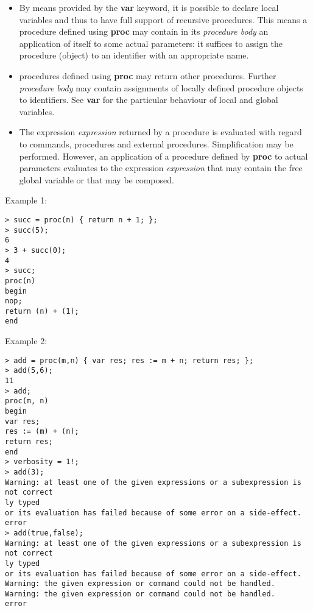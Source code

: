 \begin{itemize}
\item By means provided by the \textbf{var} keyword, it is possible to declare local
   variables and thus to have full support of recursive procedures. This
   means a procedure defined using \textbf{proc} may contain in its \emph{procedure body} 
   an application of itself to some actual parameters: it suffices
   to assign the procedure (object) to an identifier with an appropriate
   name.

\item \sollya procedures defined using \textbf{proc} may return other
   procedures. Further \emph{procedure body} may contain assignments of
   locally defined procedure objects to identifiers. See \textbf{var} for the
   particular behaviour of local and global variables.

\item The expression \emph{expression} returned by a procedure is evaluated with
   regard to \sollya commands, procedures and external
   procedures. Simplification may be performed.  However, an application
   of a procedure defined by \textbf{proc} to actual parameters evaluates to the
   expression \emph{expression} that may contain the free global variable or
   that may be composed.
\end{itemize}
\noindent Example 1: 
\begin{center}\begin{minipage}{15cm}\begin{Verbatim}[frame=single]
> succ = proc(n) { return n + 1; };
> succ(5);
6
> 3 + succ(0);
4
> succ;
proc(n)
begin
nop;
return (n) + (1);
end
\end{Verbatim}
\end{minipage}\end{center}
\noindent Example 2: 
\begin{center}\begin{minipage}{15cm}\begin{Verbatim}[frame=single]
> add = proc(m,n) { var res; res := m + n; return res; };
> add(5,6);
11
> add;
proc(m, n)
begin
var res;
res := (m) + (n);
return res;
end
> verbosity = 1!;
> add(3);
Warning: at least one of the given expressions or a subexpression is not correct
ly typed
or its evaluation has failed because of some error on a side-effect.
error
> add(true,false);
Warning: at least one of the given expressions or a subexpression is not correct
ly typed
or its evaluation has failed because of some error on a side-effect.
Warning: the given expression or command could not be handled.
Warning: the given expression or command could not be handled.
error
\end{Verbatim}
\end{minipage}\end{center}
